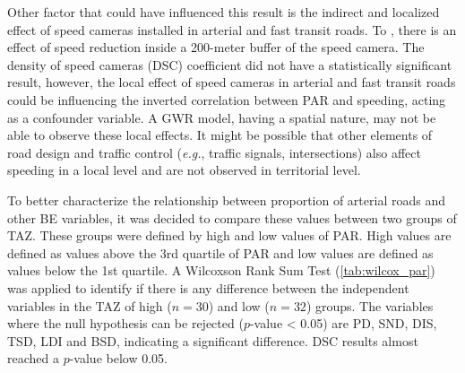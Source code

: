 Other factor that could have influenced this result is the indirect and localized effect of speed cameras installed in arterial and fast transit roads. To \textcite{Li2013a, Oliveira2015}, there is an effect of speed reduction inside a 200-meter buffer of the speed camera. The density of speed cameras (DSC) coefficient did not have a statistically significant result, however, the local effect of speed cameras in arterial and fast transit roads could be influencing the inverted correlation between PAR and speeding, acting as a confounder variable. A GWR model, having a spatial nature, may not be able to observe these local effects. It might be possible that other elements of road design and traffic control (\textit{e.g.}, traffic signals, intersections) also affect speeding in a local level and are not observed in territorial level.

To better characterize the relationship between proportion of arterial roads and other BE variables, it was decided to compare these values between two groups of TAZ. These groups were defined by high and low values of PAR. High values are defined as values above the 3rd quartile of PAR and low values are defined as values below the 1st quartile. A Wilcoxson Rank Sum Test (\autoref{tab:wilcox_par}) was applied to identify if there is any difference between the independent variables in the TAZ of high ($n = 30$) and low ($n = 32$) groups. The variables where the null hypothesis can be rejected ($p$-value < 0.05) are PD, SND, DIS, TSD, LDI and BSD, indicating a significant difference. DSC results almost reached a $p$-value below 0.05.

